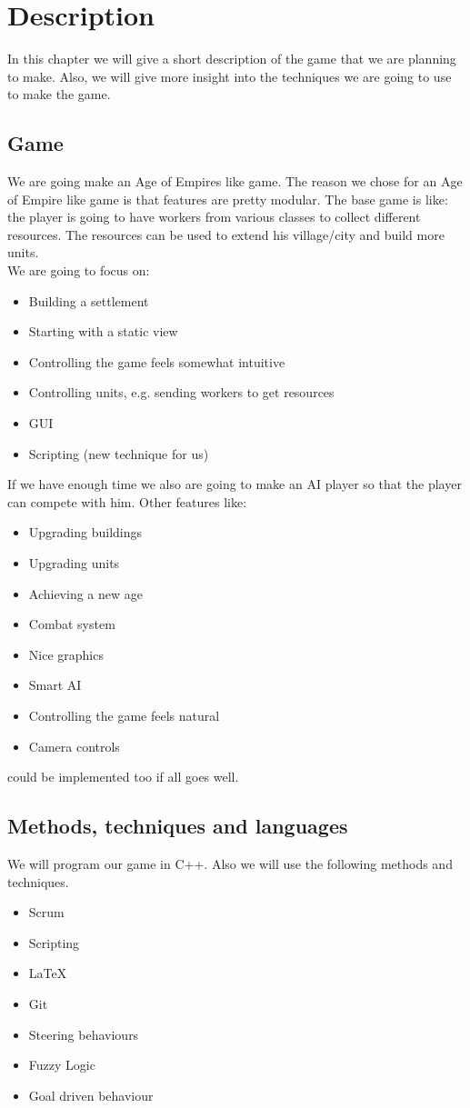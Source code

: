 \section{Description}
In this chapter we will give a short description of the game that we are planning to make. Also, we will give more insight into the techniques we are going to use to make the game.

\subsection{Game}
We are going  make an Age of Empires like game. The reason we chose for an Age of Empire like game is that features are pretty modular. The base game is like: the player is going to have workers from various classes to collect different resources. The resources can be used to extend his village/city and build more units. ~\\
We are going to focus on:
\begin{itemize}
  \item Building a settlement
  \item Starting with a static view
  \item Controlling the game feels somewhat intuitive
  \item Controlling units, e.g. sending workers to get resources
  \item GUI
  \item Scripting (new technique for us)
\end{itemize}

If we have enough time we also are going to make an AI player so that the player can compete with him. Other features like:
\begin{itemize}
  \item Upgrading buildings
  \item Upgrading units
  \item Achieving a new age
  \item Combat system
  \item Nice graphics
  \item Smart AI
  \item Controlling the game feels natural
  \item Camera controls
\end{itemize}
could be implemented too if all goes well.

\subsection{Methods, techniques and languages}
We will program our game in C++. Also we will use the following methods and techniques.
\begin{itemize}
  \item Scrum
  \item Scripting 
  \item \LaTeX
  \item Git
  \item Steering behaviours
  \item Fuzzy Logic
  \item Goal driven behaviour
\end{itemize}